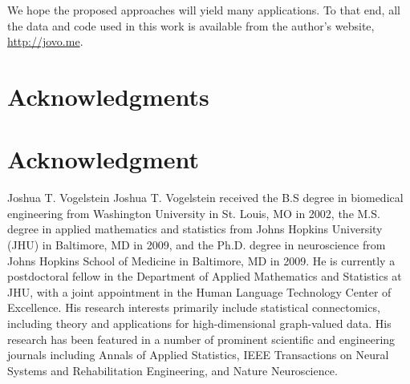 \documentclass[10pt,journal,cspaper,compsoc]{IEEEtran}
\begin{document}
We hope the proposed approaches will yield many applications.  To that end, all the data and code used in this work is available from the author's website, \url{http://jovo.me}.  

% 
% 
% 


% 

\ifCLASSOPTIONcompsoc
  \section*{Acknowledgments}
\else
  \section*{Acknowledgment}
\fi


\ifCLASSOPTIONcaptionsoff
  \newpage
\fi





\begin{IEEEbiographynophoto}{Joshua T. Vogelstein}
Joshua T. Vogelstein received the B.S degree in biomedical engineering from Washington University in St. Louis, MO in 2002, the M.S. degree in applied mathematics and statistics from Johns Hopkins University (JHU) in Baltimore, MD in 2009, and the Ph.D. degree in neuroscience from Johns Hopkins School of Medicine in Baltimore, MD in 2009.  He is currently a postdoctoral fellow in the Department of Applied Mathematics and Statistics at JHU, with a joint appointment in the Human Language Technology Center of Excellence.  His research interests primarily include statistical connectomics, including theory and applications for high-dimensional graph-valued data. His research has been featured in a number of prominent scientific and engineering journals including Annals of Applied Statistics, IEEE Transactions on Neural Systems and Rehabilitation Engineering, and Nature Neuroscience.
\end{IEEEbiographynophoto}
\end{document}
